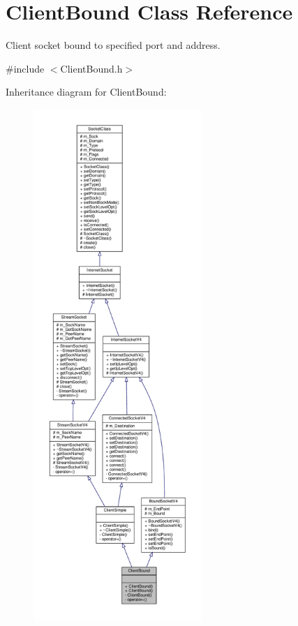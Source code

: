 \hypertarget{classClientBound}{}\section{Client\+Bound Class Reference}
\label{classClientBound}


Client socket bound to specified port and address.  




{\ttfamily \#include $<$Client\+Bound.\+h$>$}



Inheritance diagram for Client\+Bound\+:\nopagebreak
\begin{figure}[H]
\begin{center}
\leavevmode
\includegraphics[height=550pt]{classClientBound__inherit__graph}
\end{center}
\end{figure}

